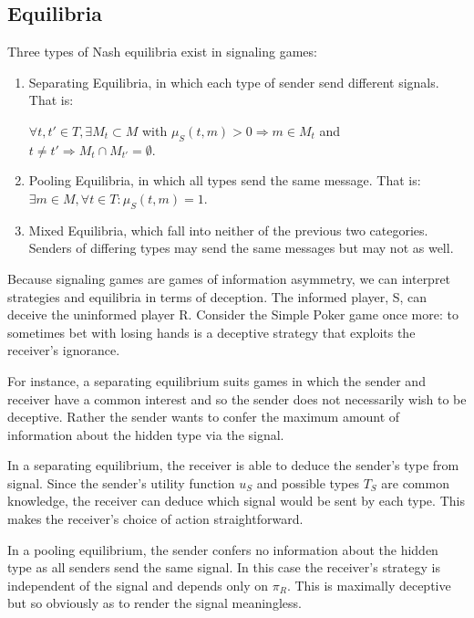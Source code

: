 \documentclass{article}
\begin{document}
\subsection{Equilibria}

Three types of Nash equilibria exist in signaling games:

\begin{enumerate}
\item Separating Equilibria, in which each type of sender send different signals. That is:

$\forall t, t' \in T, \exists M_{t} \subset M$ with $\mu_S(t,m) > 0 \Rightarrow m \in M_{t}$ and $t \ne t' \Rightarrow M_{t} \cap M_{t'} = \emptyset$.

\item Pooling Equilibria, in which all types send the same message. That is: $\exists  m \in M, \forall t \in T : \mu_S(t,m) = 1$.

\item Mixed Equilibria, which fall into neither of the previous two categories. Senders of differing types may send the same messages but may not as well. 
\end{enumerate}

Because signaling games are games of information asymmetry, we can interpret strategies and equilibria in terms of deception. The informed player, S, can deceive the uninformed player R. Consider the Simple Poker game once more: to sometimes bet with losing hands is a deceptive strategy that exploits the receiver's ignorance. 

 For instance, a separating equilibrium suits games in which the sender and receiver have a common interest and so the sender does not necessarily wish to be deceptive. Rather the sender wants to confer the maximum amount of information about the hidden type via the signal.

In a separating equilibrium, the receiver is able to deduce the sender's type from signal. Since the sender's utility function $u_{S}$ and possible types $T_S$ are common knowledge, the receiver can deduce which signal would be sent by each type. This makes the receiver's choice of action straightforward.

In a pooling equilibrium, the sender confers no information about the hidden type as all senders send the same signal. In this case the receiver's strategy is independent of the signal and depends only on $\pi_{ R}$. This is maximally deceptive but so obviously as to render the signal meaningless.
\end{document}
